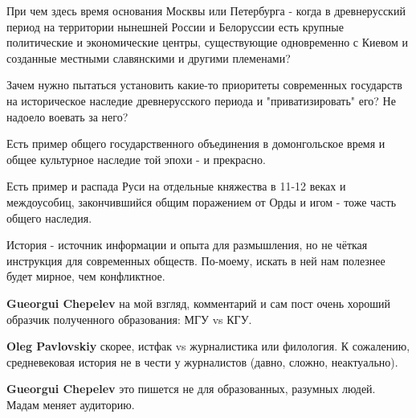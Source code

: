 \begin{itemize}
При чем здесь время основания Москвы или Петербурга - когда в древнерусский
период на территории нынешней России и Белоруссии есть крупные политические и
экономические центры, существующие одновременно с Киевом и созданные местными
славянскими и другими племенами? 

Зачем нужно пытаться установить какие-то приоритеты современных государств на
историческое наследие древнерусского периода и "приватизировать" его? Не
надоело воевать за него? 

Есть пример общего государственного объединения в домонгольское время и общее
культурное наследие той эпохи - и прекрасно. 

Есть пример и распада Руси на отдельные княжества в 11-12 веках и междоусобиц,
закончившийся общим поражением от Орды и игом - тоже часть общего наследия. 

История - источник информации и опыта для размышления, но не чёткая инструкция
для современных обществ. По-моему, искать в ней нам полезнее будет мирное, чем
конфликтное.

\begin{itemize}
 
\textbf{Gueorgui Chepelev} на мой взгляд, комментарий и сам пост очень хороший образчик полученного образования: МГУ vs КГУ.

 
\textbf{Oleg Pavlovskiy} скорее, истфак vs журналистика или филология. К сожалению, средневековая история не в чести у журналистов (давно, сложно, неактуально).

 
\textbf{Gueorgui Chepelev} это пишется не для образованных, разумных людей. Мадам меняет аудиторию.

 

\end{itemize}
\end{itemize}
